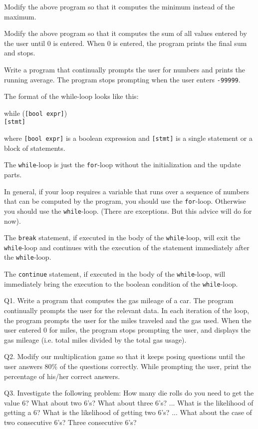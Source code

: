 \begin{ex}
Modify the above program so that it computes the
minimum instead of the maximum.
\end{ex}

\begin{ex} Modify the above program so that it computes the sum
of all values entered by the user until 0 is entered. When 0 is entered,
the program prints the final sum and stops.
\end{ex}
\begin{ex}
Write a program that continually prompts the user
for numbers and prints the running average. The program stops prompting
when the user enters \texttt{-99999}.
\end{ex}
\newpage{}

The format of the while-loop looks like this:
\begin{center}
while (\texttt{[bool expr]})\\
\texttt{[stmt]}
\end{center}
where \texttt{[bool expr]} is a boolean expression and \texttt{[stmt]} is a single statement or a block of statements.

The \texttt{while}-loop is just the \texttt{for}-loop without the
initialization and the update parts.

In general, if your loop requires a variable that runs over a sequence
of numbers that can be computed by the program, you should use the
\texttt{for}-loop. Otherwise you should use the \texttt{while}-loop. (There
are exceptions. But this advice will do for now).

The \texttt{break} statement, if executed in the body of the
\texttt{while}-loop, will exit the \texttt{while}-loop and continues with
the execution of the statement immediately after the \texttt{while}-loop.

The \texttt{continue} statement, if executed in the body of the
\texttt{while}-loop, will immediately bring the execution to the boolean
condition of the \texttt{while}-loop.

\newpage{}


Q1. Write a program that computes the gas mileage of a car. The program
continually prompts the user for the relevant data. In each iteration of
the loop, the program prompts the user for the miles traveled and the
gas used. When the user entered 0 for miles, the program stops prompting
the user, and displays the gas mileage (i.e. total miles divided by the
total gas usage).

Q2. Modify our multiplication game so that it keeps posing questions
until the user answers 80\% of the questions correctly. While prompting
the user, print the percentage of his/her correct answers.

Q3. Investigate the following problem: How many die rolls do you need to
get the value 6? What about two 6's? What about three
6's? ... What is the likelihood of getting a 6? What is
the likelihood of getting two 6's? ... What about the
case of two consecutive 6's? Three consecutive
6's?
